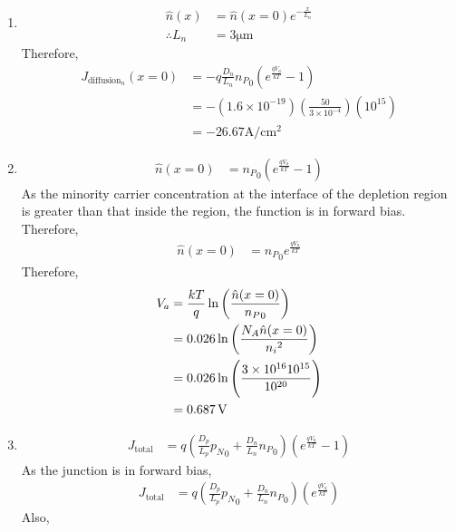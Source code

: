 \documentclass[titlepage, fleqn, a4paper, 12pt, twoside]{article}
\theoremstyle{definition}
\theoremstyle{theorem}
\begin{document}
\begin{solution}
	\begin{enumerate}[leftmargin=*]
		\item
			\begin{align*}
				\hat{n}(x) &= \hat{n}(x = 0) e^{-\frac{x}{L_n}}\\
				\therefore L_n &= 3 \si{\micro\metre}
			\end{align*}
			Therefore,
			\begin{align*}
				J_{\text{diffusion}_n}(x = 0) &= -q \frac{D_n}{L_n} {n_P}_0 \left( e^{\frac{q V_a}{k T}} - 1 \right)\\
				&= -\left( 1.6 \times 10^{-19} \right) \left( \frac{50}{3 \times 10^{-4}} \right) \left( 10^{15} \right)\\
				&= -26.67 \si{\ampere\per\centi\metre\squared}
			\end{align*}
		\item
			\begin{align*}
				\hat{n}(x = 0) &= {n_P}_0 \left( e^{\frac{q V_a}{k T}} - 1 \right)
			\end{align*}
			As the minority carrier concentration at the interface of the depletion region is greater than that inside the region, the function is in forward bias.
			Therefore,
			\begin{align*}
				\hat{n}(x = 0) &= {n_P}_0 e^{\frac{q V_a}{k T}}
			\end{align*}
			Therefore,
			\begin{align*}
				V_a &= \frac{k T}{q} \ln\left( \frac{\hat{n}(x = 0)}{{n_P}_0} \right)\\
				&= 0.026 \ln\left( \frac{N_A \hat{n}(x = 0)}{{n_i}^2} \right)\\
				&= 0.026 \ln \left( \frac{3 \times 10^{16} 10^{15}}{10^{20}} \right)\\
				&= 0.687 \volt
			\end{align*}
		\item
			\begin{align*}
				J_{\text{total}} &= q \left( \frac{D_p}{L_p} {p_N}_0 + \frac{D_n}{L_n} {n_P}_0 \right) \left( e^{\frac{q V_a}{k T}} - 1 \right)
			\end{align*}
			As the junction is in forward bias,
			\begin{align*}
				J_{\text{total}} &= q \left( \frac{D_p}{L_p} {p_N}_0 + \frac{D_n}{L_n} {n_P}_0 \right) \left( e^{\frac{q V_a}{k T}} \right)
			\end{align*}
			Also,
			\begin{align*}

\end{align*}
\end{enumerate}
\end{solution}
\end{document}
